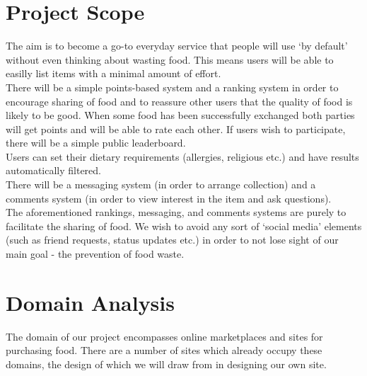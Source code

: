 \documentclass[12pt]{article}
\begin{document}
\section{Project Scope}
The aim is to become a go-to everyday service that people will use `by default' without even thinking about wasting food. This means users will be able to easilly list items with a minimal amount of effort.\\
There will be a simple points-based system and a ranking system in order to
encourage sharing of food and to reassure other users that the quality of food is
likely to be good. When some food has been successfully exchanged both
parties will get points and will be able to rate each other. If users wish to
participate, there will be a simple public leaderboard.\\
Users can set their dietary requirements (allergies, religious etc.) and have
results automatically filtered. \\
There will be a messaging system (in order to arrange collection) and a comments
system (in order to view interest in the item and ask questions).\\
The aforementioned rankings, messaging, and comments systems are purely to facilitate the sharing of food.
We wish to avoid any sort of `social media' elements
(such as friend requests, status updates etc.) in order to not lose sight of our main goal - the prevention of food waste.


\section{Domain Analysis}

The domain of our project encompasses online marketplaces and sites for purchasing food.
There are a number of sites which already occupy these domains, the design of which we will draw from in designing our own site.
\end{document}
